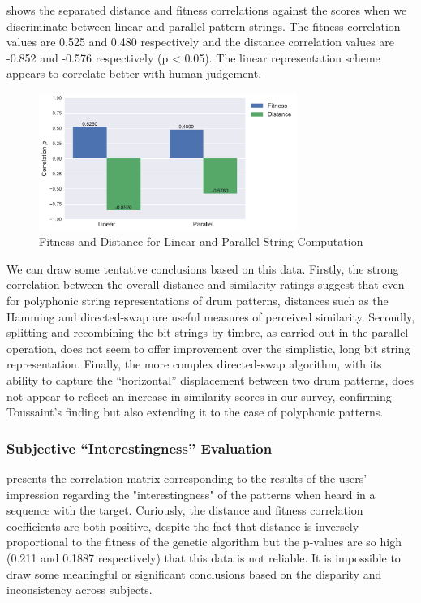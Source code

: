 {{ shows the separated distance and fitness correlations against the scores when we discriminate between linear and parallel pattern strings. The fitness correlation values are 0.525 and 0.480 respectively and the distance correlation values are -0.852 and -0.576 respectively (p < 0.05). The linear representation scheme appears to correlate better with human judgement.

\begin{figure}
	\begin{center}
		\includegraphics[width=0.75\textwidth]{ch03_symbolic/figures/reps_bar.pdf}
	\end{center}
	\caption[Fitness and Distance for Linear and Parallel String Computation]{Fitness and Distance for Linear and Parallel String Computation}
	\label{fig:linear_versus_parallel}
\end{figure}

We can draw some tentative conclusions based on this data. Firstly, the strong correlation between the overall distance and similarity ratings suggest that even for polyphonic string representations of drum patterns, distances such as the Hamming and directed-swap are useful measures of perceived similarity. Secondly, splitting and recombining the bit strings by timbre, as carried out in the parallel operation, does not seem to offer improvement over the simplistic, long bit string representation. Finally, the more complex directed-swap algorithm, with its ability to capture the ``horizontal'' displacement between two drum patterns, does not appear to reflect an increase in similarity scores in our survey, confirming Toussaint's finding but also extending it to the case of polyphonic patterns.

\subsubsection{Subjective “Interestingness” Evaluation}

 presents the correlation matrix corresponding to the results of the users' impression regarding the "interestingness" of the patterns when heard in a sequence with the target. Curiously, the distance and fitness correlation coefficients are both positive, despite the fact that distance is inversely proportional to the fitness of the genetic algorithm but the p-values are so high (0.211 and 0.1887 respectively) that this data is not reliable. It is impossible to draw some meaningful or significant conclusions based on the disparity and inconsistency across subjects.

}}
